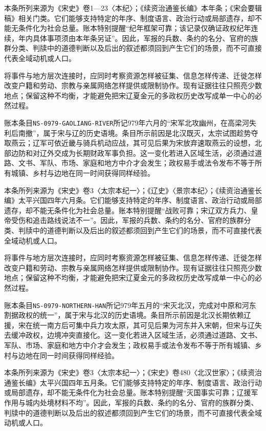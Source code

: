 本条所列来源为《宋史》卷1—23〈本纪〉；《续资治通鉴长编》本年条；《宋会要辑稿》相关门类。它们能够支持特定的年序、制度语言、政治行动或局部遗存，却不能无条件化为社会总量。账本特别提醒“纪年框架可靠；该记录仅确证政权纪年连续，年内具体事项须由本年条另证”。因此，军报的兵数、条约的名分、官府的族群分类、判牍中的道德判断以及后出的叙述都须回到产生它们的场景，而不可直接代表全域动机或人口。

将事件与地方层次连接时，应同时考察资源怎样被征集、信息怎样传递、迁徙怎样改变户籍和劳动、宗教与亲属网络怎样提供或限制协作。现有证据往往只照亮少数地点；保留这种不均衡，才能避免把宋辽夏金元的多政权历史改写成单一中心的必然过程。

账本条目\texttt{NS-0979-GAOLIANG-RIVER}所记979年六月的“宋军北攻幽州，在高梁河失利后南撤”，属于宋与辽的历史语境。条目所示前因是北汉既灭，太宗试图趁势夺取燕云；辽军可依近畿与骑兵机动应战，其可见后果为宋放弃速取燕云的设想，北部边防和对辽外交成为长期财政军事负担。这一变化若进入区域生活，必须通过道路、文书、军队、市场、家庭和地方中介才会发生；政权易手或法令发布不等于所有城镇、乡村与边地在同一时间获得同样经验。

本条所列来源为《宋史》卷3〈太宗本纪一〉；《辽史》〈景宗本纪〉；《续资治通鉴长编》太平兴国四年六月条。它们能够支持特定的年序、制度语言、政治行动或局部遗存，却不能无条件化为社会总量。账本特别提醒“战败可靠；宋辽双方兵力、皇帝受伤和追击路线说法不一”。因此，军报的兵数、条约的名分、官府的族群分类、判牍中的道德判断以及后出的叙述都须回到产生它们的场景，而不可直接代表全域动机或人口。

将事件与地方层次连接时，应同时考察资源怎样被征集、信息怎样传递、迁徙怎样改变户籍和劳动、宗教与亲属网络怎样提供或限制协作。现有证据往往只照亮少数地点；保留这种不均衡，才能避免把宋辽夏金元的多政权历史改写成单一中心的必然过程。

账本条目\texttt{NS-0979-NORTHERN-HAN}所记979年五月的“宋灭北汉，完成对中原和河东割据政权的统一”，属于宋与北汉的历史语境。条目所示前因是北汉长期依赖辽援，宋在统一南方后可集中兵力攻太原，其可见后果为河东并入宋朝，但宋与辽失去缓冲政权，边境冲突直接化。这一变化若进入区域生活，必须通过道路、文书、军队、市场、家庭和地方中介才会发生；政权易手或法令发布不等于所有城镇、乡村与边地在同一时间获得同样经验。

本条所列来源为《宋史》卷3〈太宗本纪一〉；《宋史》卷480〈北汉世家〉；《续资治通鉴长编》太平兴国四年五月条。它们能够支持特定的年序、制度语言、政治行动或局部遗存，却不能无条件化为社会总量。账本特别提醒“灭国事实可靠；辽援军作用与城内处境材料不均”。因此，军报的兵数、条约的名分、官府的族群分类、判牍中的道德判断以及后出的叙述都须回到产生它们的场景，而不可直接代表全域动机或人口。

